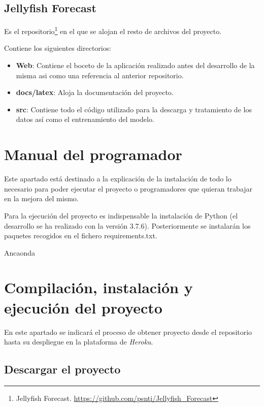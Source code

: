 \subsection{Jellyfish Forecast}
Es el repositorio\footnote{Jellyfish Forecast. \url{https://github.com/psnti/Jellyfish_Forecast}} en el que se alojan el resto de archivos del proyecto.

Contiene los siguientes directorios:
\begin{itemize}
	\item \textbf{Web}: Contiene el boceto de la aplicación realizado antes del desarrollo de la misma asi como una referencia al anterior repositorio.
	\item \textbf{docs/latex}: Aloja la documentación del proyecto.
	\item \textbf{src}: Contiene todo el código utilizado para la descarga y tratamiento de los datos así como el entrenamiento del modelo.
\end{itemize}

\section{Manual del programador}

Este apartado está destinado a la explicación de la instalación de todo lo necesario para poder ejecutar el proyecto o programadores que quieran trabajar en la mejora del mismo.

Para la ejecución del proyecto es indispensable la instalación de Python (el desarrollo se ha realizado con la versión 3.7.6). Posteriormente se instalarán los paquetes recogidos en el fichero requirements.txt.

Ancaonda





\section{Compilación, instalación y ejecución del proyecto}

En este apartado se indicará el proceso de obtener proyecto desde el repositorio hasta su despliegue en la plataforma de \emph{Heroku}.

\subsection{Descargar el proyecto}\label{Descarga}

